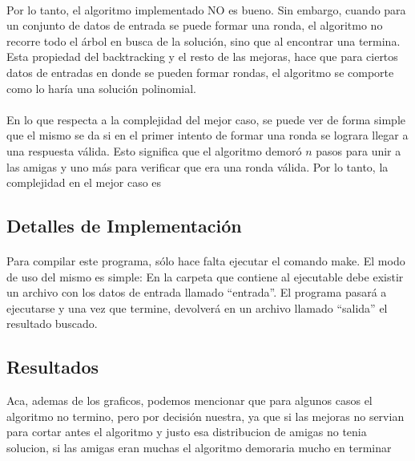 \paragraph{}
Por lo tanto, el algoritmo implementado NO es bueno. Sin embargo, cuando para un conjunto de datos de entrada se puede formar una ronda, el algoritmo no recorre todo el árbol en busca de la solución, sino que al encontrar una termina. Esta propiedad del backtracking y el resto de las mejoras, hace que para ciertos datos de entradas en donde se pueden formar rondas, el algoritmo se comporte como lo haría una solución polinomial.

\paragraph{}
En lo que respecta a la complejidad del mejor caso, se puede ver de forma simple que el mismo se da si en el primer intento de formar una ronda se lograra llegar a una respuesta válida. Esto significa que el algoritmo demoró $n$ pasos para unir a las amigas y uno más para verificar que era una ronda válida. Por lo tanto, la complejidad en el mejor caso es 


\subsection{Detalles de Implementación}
\paragraph{}
Para compilar este programa, sólo hace falta ejecutar el comando make. El modo de uso del mismo es simple: En la carpeta que contiene al ejecutable debe existir un archivo con los datos de entrada llamado ``entrada''. El programa pasará a ejecutarse y una vez que termine, devolverá en un archivo llamado ``salida'' el resultado buscado.



\subsection{Resultados}
\label{resultadosej2}
Aca, ademas de los graficos, podemos mencionar que para algunos casos el algoritmo no termino, pero por decisión nuestra, ya que si las mejoras no servian para cortar antes el algoritmo y justo esa distribucion de amigas no tenia solucion, si las amigas eran muchas el algoritmo demoraria mucho en terminar



